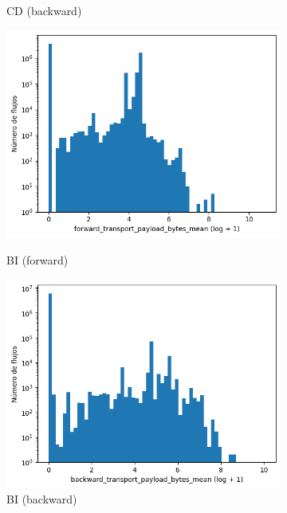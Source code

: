 \begin{figure}[H]
\begin{subfigure}[b]{0.26\textwidth}
        \caption{CD (backward)}
    \end{subfigure}
    \hfill
    \begin{subfigure}[b]{0.26\textwidth}
        \centering
        \includegraphics[width=\linewidth]{media/packet_pincer_botiot/forward_transport_payload_bytes_mean_log_x_log_y.png}
        \caption{BI (forward)}
        \includegraphics[width=\linewidth]{media/packet_pincer_botiot/backward_transport_payload_bytes_mean_log_x_log_y.png}
        \caption{BI (backward)}
    \end{subfigure}
    \hfill
    \begin{subfigure}[b]{0.26\textwidth}
        \centering

\end{subfigure}
\end{figure}
